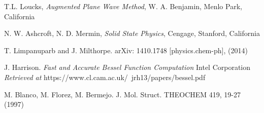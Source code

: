\documentclass[11pt]{article}
\numberwithin{equation}{section}
\begin{document}
\begin{thebibliography}{99}

  T.L. Loucks, \textit{Augmented Plane Wave Method}, W. A. Benjamin, Menlo Park, California
  
  N. W. Ashcroft, N. D. Mermin, \textit{Solid State Physics}, Cengage, Stanford, California
  
  T. Limpanuparb and J. Milthorpe. arXiv: 1410.1748 [physics.chem-ph], (2014)
  
  J. Harrison. \textit{Fast and Accurate Bessel Function Computation} Intel Corporation \\
  \textit{Retrieved at } https://www.cl.cam.ac.uk/~jrh13/papers/bessel.pdf
  
  M. Blanco, M. Florez, M. Bermejo. J. Mol. Struct. THEOCHEM 419, 19-27 (1997)
  

\end{thebibliography}
\end{document}

